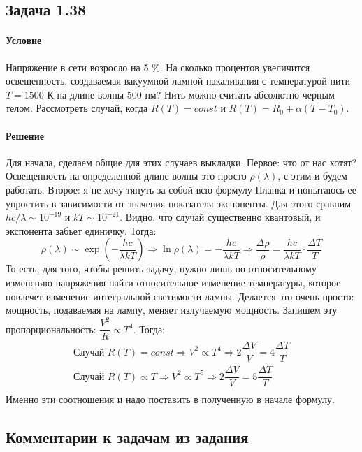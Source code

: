 \documentclass[12pt]{article}
\begin{document}
\subsection{Задача 1.38}
\label{task_138}
\paragraph{Условие}
Напряжение в сети возросло на 5 \%. На сколько процентов увеличится освещенность, создаваемая вакуумной лампой накаливания с температурой нити $T = 1500$ К на длине волны 500 нм? Нить можно считать абсолютно черным телом. Рассмотреть случай, когда $R(T) = const$ и $R(T) = R_0 + \alpha (T - T_0)$.
\paragraph{Решение}
Для начала, сделаем общие для этих случаев выкладки. Первое: что от нас хотят? Освещенность на определенной длине волны это просто $\rho(\lambda)$, с этим и будем работать. Второе: я не хочу тянуть за собой всю формулу Планка и попытаюсь ее упростить в зависимости от значения показателя экспоненты. Для этого сравним $hc/\lambda \sim 10^{-19}$ и $kT\sim10^{-21}$. Видно, что случай существенно квантовый, и экспонента забьет единичку. Тогда:
\begin{equation*}
    \rho(\lambda) \sim \exp{\left(-\dfrac{hc}{\lambda kT} \right)} \Rightarrow \ln{\rho(\lambda)} = -\dfrac{hc}{\lambda kT} \Rightarrow \dfrac{\Delta \rho}{\rho} = \dfrac{hc}{\lambda kT} \cdot \dfrac{\Delta T}{T}
\end{equation*}
То есть, для того, чтобы решить задачу, нужно лишь по относительному изменению напряжения найти относительное изменение температуры, которое повлечет изменение интегральной светимости лампы. Делается это очень просто: мощность, подаваемая на лампу, меняет излучаемую мощность. Запишем эту пропорциональность: $\dfrac{V^2}{R} \propto T^4$. Тогда:
\begin{gather*}
    \text{Случай } R(T) = const \Rightarrow V^2 \propto T^4 \Rightarrow 2\dfrac{\Delta V}{V} = 4\dfrac{\Delta T}{T}\\
    \text{Случай } R(T) \propto T \Rightarrow V^2 \propto T^5 \Rightarrow 2\dfrac{\Delta V}{V} = 5\dfrac{\Delta T}{T}\\
\end{gather*}
Именно эти соотношения и надо поставить в полученную в начале формулу.

\subsection{Комментарии к задачам из задания}
\end{document}
